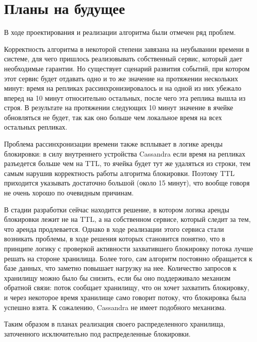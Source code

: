 \section{Планы на будущее}

В ходе проектирования и реализации алгоритма были отмечен ряд проблем.

Корректность алгоритма в некоторой степени завязана на неубывании времени в системе, для чего пришлось реализовывать собственный сервис, который дает необходимые гарантии. Но существует сценарий развития событий, при котором этот сервис будет отдавать одно и то же значение на протяжении нескольких минут: время на репликах рассинхронизировалось и на одной из них убежало вперед на 10 минут относительно остальных, после чего эта реплика вышла из строя. В результате на протяжении следующих 10 минут значение в ячейке обновляться не будет, так как оно больше чем локальное время на всех остальных репликах.

Проблема рассинхронизации времени также всплывает в логике аренды блокировки: в силу внутреннего устройства Cassandra если время на репликах разъедется больше чем на TTL, то ячейка будет тут же удаляться из строки, тем самым нарушив корректность работы алгоритма блокировки. Поэтому TTL приходится указывать достаточно большой (около 15 минут), что вообще говоря не очень хорошо по очевидным причинам.

В стадии разработки сейчас находится решение, в котором логика аренды блокировки лежит не на TTL, а на собственном сервисе, который следит за тем, что аренда продлевается. Однако в ходе реализации этого сервиса стали возникать проблемы, в ходе решения которых становится понятно, что в принципе логику с проверкой активности захватившего блокировку потока лучше решать на стороне хранилища. Более того, сам алгоритм постоянно обращается к базе данных, что заметно повышает нагрузку на нее. Количество запросов к хранилищу можно было бы снизить, если бы оно поддерживало механизм обратной связи: поток сообщает хранилищу, что он хочет захватить блокировку, и через некоторое время хранилище само говорит потоку, что блокировка была успешно взята. К сожалению, Cassandra не имеет подобного механизма.

Таким образом в планах реализация своего распределенного хранилища, заточенного исключительно под распределенные блокировки.